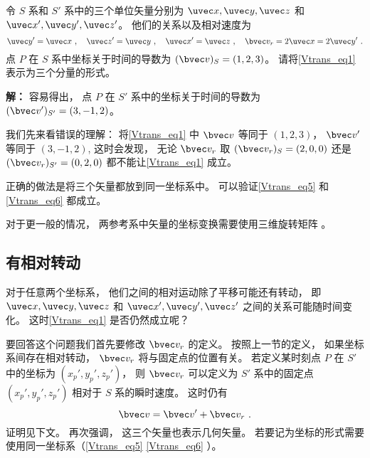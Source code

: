 \begin{example}{}\label{Vtrans_ex2}
令 $S$ 系和 $S'$ 系中的三个单位矢量分别为 $\uvec x, \uvec y, \uvec z$ 和 $\uvec x', \uvec y', \uvec z'$。 他们的关系以及相对速度为
\begin{equation}
\uvec y' = \uvec x~, \quad
\uvec z' = \uvec y~, \quad
\uvec x' = \uvec z~, \quad
\bvec v_r = 2\uvec x = 2\uvec y'~.
\end{equation}
点 $P$ 在 $S$ 系中坐标关于时间的导数为 $(\bvec v)_S = (1, 2, 3)$。 请将\autoref{Vtrans_eq1} 表示为三个分量的形式。

\textbf{解：} 容易得出， 点 $P$ 在 $S'$ 系中的坐标关于时间的导数为 $(\bvec v')_{S'} = (3, -1, 2)$。

我们先来看错误的理解： 将\autoref{Vtrans_eq1} 中 $\bvec v$ 等同于 $(1, 2, 3)$， $\bvec v'$ 等同于 $(3, -1, 2)$,  这时会发现， 无论 $\bvec v_r$ 取 $(\bvec v_r)_S = (2, 0, 0)$ 还是 $(\bvec v_r)_{S'} = (0, 2, 0)$ 都不能让\autoref{Vtrans_eq1} 成立。

正确的做法是将三个矢量都放到同一坐标系中。 可以验证\autoref{Vtrans_eq5} 和\autoref{Vtrans_eq6} 都成立。

对于更一般的情况， 两参考系中矢量的坐标变换需要使用三维旋转矩阵 。
\end{example}

\subsection{有相对转动}
对于任意两个坐标系， 他们之间的相对运动除了平移可能还有转动， 即 $\uvec x, \uvec y, \uvec z$ 和 $\uvec x', \uvec y', \uvec z'$ 之间的关系可能随时间变化。 这时\autoref{Vtrans_eq1} 是否仍然成立呢？

要回答这个问题我们首先要修改 $\bvec v_r$ 的定义。 按照上一节的定义， 如果坐标系间存在相对转动， $\bvec v_r$ 将与固定点的位置有关。 若定义某时刻点 $P$ 在 $S'$ 中的坐标为 $(x_p', y_p', z_p')$， 则 $\bvec v_r$ 可以定义为 $S'$ 系中的固定点 $(x_p', y_p', z_p')$ 相对于 $S$ 系的瞬时速度。 这时仍有
\begin{equation}\label{Vtrans_eq2}
\bvec v = \bvec v' + \bvec v_r~.
\end{equation}
证明见下文。 再次强调， 这三个矢量也表示几何矢量。 若要记为坐标的形式需要使用同一坐标系（\autoref{Vtrans_eq5} \autoref{Vtrans_eq6} ）。

